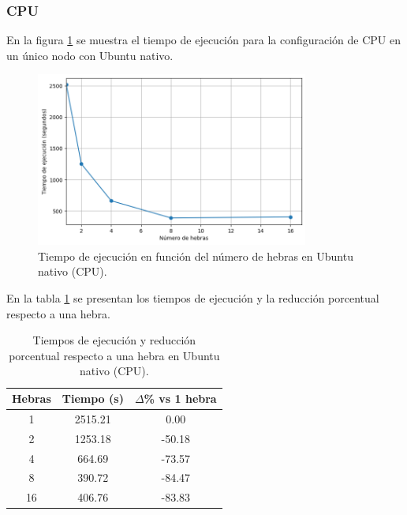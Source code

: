 \subsubsection{CPU}

En la figura \ref{fig:single-node_ubuntu_cpu_native_time} se muestra el tiempo de ejecución para la configuración de CPU en un único nodo con Ubuntu nativo.

\begin{figure}[H]
    \centering
    \includegraphics[width=0.8\textwidth]{imagenes/cap5/single-node_ubuntu_cpu_native_time.png}
    \caption{Tiempo de ejecución en función del número de hebras en Ubuntu nativo (CPU).}
    \label{fig:single-node_ubuntu_cpu_native_time}
\end{figure}

En la tabla \ref{tab:single-node_ubuntu_cpu_native} se presentan los tiempos de ejecución y la reducción porcentual respecto a una hebra.

\begin{table}[ht]
    \centering
    \begin{tabular}{|c|c|c|}
        \hline
        \textbf{Hebras} & \textbf{Tiempo (s)} & \textbf{$\Delta$\% vs 1 hebra} \\
        \hline
        1               & 2515.21             & 0.00                           \\
        2               & 1253.18             & -50.18                         \\
        4               & 664.69              & -73.57                         \\
        8               & 390.72              & -84.47                         \\
        16              & 406.76              & -83.83                         \\
        \hline
    \end{tabular}
    \caption{Tiempos de ejecución y reducción porcentual respecto a una hebra en Ubuntu nativo (CPU).}
    \label{tab:single-node_ubuntu_cpu_native}
\end{table}

